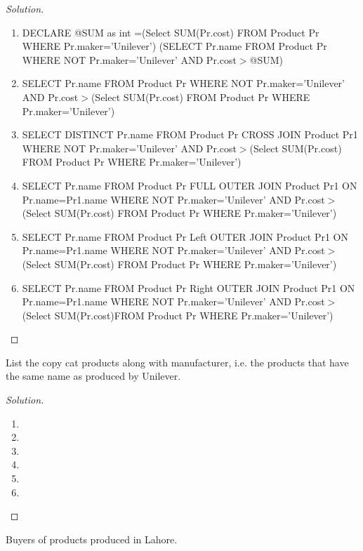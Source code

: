 \documentclass[10pt,a4paper]{article}
\newenvironment{problem}[2][Problem]{\begin{trivlist}
\item[\hskip \labelsep {\bfseries #1}\hskip \labelsep {\bfseries #2.}]}{\end{trivlist}}
\begin{document}
\begin{proof}[Solution]
\begin{enumerate}
	\item DECLARE @SUM as int =(Select SUM(Pr.cost) FROM Product Pr WHERE Pr.maker='Unilever') (SELECT Pr.name FROM Product Pr WHERE NOT Pr.maker='Unilever' AND Pr.cost$>$@SUM)
	\item SELECT Pr.name FROM Product Pr WHERE NOT Pr.maker='Unilever' AND Pr.cost$>$(Select SUM(Pr.cost) FROM Product Pr WHERE Pr.maker='Unilever')
	\item SELECT DISTINCT Pr.name FROM Product Pr CROSS JOIN Product Pr1 WHERE NOT Pr.maker='Unilever' AND Pr.cost$>$(Select SUM(Pr.cost) FROM Product Pr WHERE Pr.maker='Unilever')
	\item SELECT  Pr.name FROM Product Pr FULL OUTER JOIN Product Pr1 ON Pr.name=Pr1.name WHERE NOT Pr.maker='Unilever' AND Pr.cost$>$(Select SUM(Pr.cost) FROM Product Pr WHERE Pr.maker='Unilever')
	\item SELECT  Pr.name FROM Product Pr Left OUTER JOIN Product Pr1 ON Pr.name=Pr1.name WHERE NOT Pr.maker='Unilever' AND Pr.cost$>$(Select SUM(Pr.cost) FROM Product Pr WHERE Pr.maker='Unilever')
	\item SELECT  Pr.name FROM Product Pr Right OUTER JOIN Product Pr1
ON Pr.name=Pr1.name WHERE NOT Pr.maker='Unilever' AND Pr.cost$>$(Select SUM(Pr.cost)FROM Product Pr WHERE Pr.maker='Unilever')
\end{enumerate}
\end{proof}

\begin{problem}{4}
List the copy cat products along with manufacturer, i.e. the products that have the same name as produced by Unilever.
\end{problem}

\begin{proof}[Solution]
\begin{enumerate}
	\item
	\item
	\item
	\item
	\item
	\item
\end{enumerate}
\end{proof}

\begin{problem}{5}
Buyers of products produced in Lahore. 
\end{problem}
\end{document}
